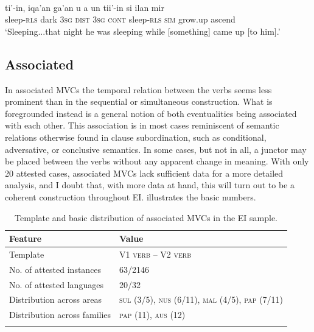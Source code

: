 \ea 
{}\\
\gll ti'-in, iqa'an ga'an u a un tii'-in si ilan mir \\
sleep-\textsc{rls} dark 3\textsc{sg} \textsc{dist} 3\textsc{sg} \textsc{cont} sleep-\textsc{rls} \textsc{sim} grow.up ascend \\
\glft `Sleeping...that night he was sleeping while [something] came up [to him].'\\ 
\z

\subsection{Associated}

In associated MVCs the temporal relation between the verbs seems less prominent than in the sequential or simultaneous construction. What is foregrounded instead is a general notion of both eventualities being associated with each other. This association is in most cases reminiscent of semantic relations otherwise found in clause subordination, such as conditional, adversative, or conclusive semantics. In some cases, but not in all, a junctor may be placed between the verbs without any apparent change in meaning. With only 20 attested cases, associated MVCs lack sufficient data for a more detailed analysis, and I doubt that, with more data at hand, this will turn out to be a coherent construction throughout EI.  illustrates the basic numbers.

\begin{table}[t]
\begin{tabular}{ll}
\lsptoprule
Feature&Value\tabularnewline
\midrule
Template& V1 \textsc{verb} -- V2 \textsc{verb}\tabularnewline
No. of attested instances& 63/2146 \tabularnewline
No. of attested languages& 20/32 \tabularnewline
Distribution across areas& \textsc{sul} (3/5), \textsc{nus} (6/11), \textsc{mal} (4/5), \textsc{pap} (7/11) \tabularnewline
Distribution across families& \textsc{pap} (11), \textsc{aus} (12) \tabularnewline
\lspbottomrule
\end{tabular}
\caption[Template and basic distribution of associated MVCs]{Template and basic distribution of associated MVCs in the EI sample.}
\label{table:associated}
\end{table}

